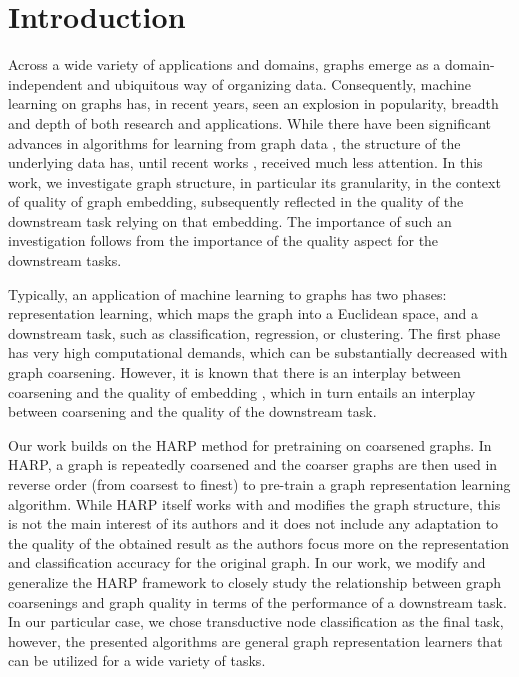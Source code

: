 \section{Introduction}
Across a wide variety of applications and domains, graphs emerge as a domain-independent and ubiquitous way of organizing data. Consequently, machine learning on graphs has, in recent years, seen an explosion in popularity, breadth and depth of both research and applications. While there have been significant advances in algorithms for learning from graph data \cite{defferrard_convolutional_2016, kipf_semi-supervised_2017}, the structure of the underlying data has, until recent works \cite{topping_understanding_2021, velickovic_geometric_2021}, received much less attention. In this work, we investigate graph structure, in particular its granularity, in the context of quality of graph embedding, subsequently reflected in the quality of the downstream task relying on that embedding. The importance of such an investigation follows from the importance of the quality aspect for the downstream tasks.

Typically, an application of machine learning to graphs has two phases: representation learning, which maps the graph into a Euclidean space, and a downstream task, such as classification, regression, or clustering. The first phase has very high computational demands, which can be substantially decreased with graph coarsening. However, it is known that there is an interplay between coarsening and the quality of embedding \cite{akyildiz_understanding_2020, makarov_survey_2021}, which in turn entails an interplay between coarsening and the quality of the downstream task.

Our work builds on the HARP \cite{chen_harp_2018} method for pretraining on coarsened graphs. In HARP, a graph is repeatedly coarsened and the coarser graphs are then used in reverse order (from coarsest to finest) to pre-train a graph representation learning algorithm. While HARP itself works with and modifies the graph structure, this is not the main interest of its authors and it does not include any adaptation to the quality of the obtained result as the authors focus more on the representation and classification accuracy for the original graph. In our work, we modify and generalize the HARP framework to closely study the relationship between graph coarsenings and graph quality in terms of the performance of a downstream task. In our particular case, we chose transductive node classification as the final task, however, the presented algorithms are general graph representation learners that can be utilized for a wide variety of tasks.

